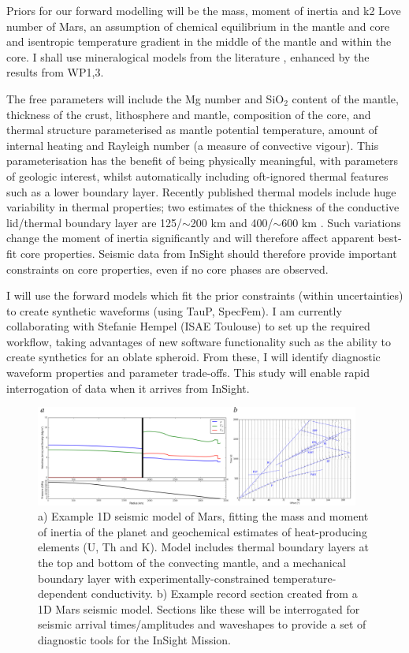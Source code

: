 \documentclass[11pt,twoside,a4paper]{article}
\begin{document}
Priors for our forward modelling will be the mass, moment of inertia and k2 Love number of Mars, an assumption of chemical equilibrium in the mantle and core and isentropic temperature gradient in the middle of the mantle and within the core. I shall use mineralogical models from the literature \citep[e.g.][]{SLB2011}, enhanced by the results from WP1,3. 

The free parameters will include the Mg number and SiO$_2$ content of the mantle, thickness of the crust, lithosphere and mantle, composition of the core, and thermal structure parameterised as mantle potential temperature, amount of internal heating and Rayleigh number (a measure of convective vigour). This parameterisation \citep[which will follow that described in][]{MJP2005} has the benefit of being physically meaningful, with parameters of geologic interest, whilst automatically including oft-ignored thermal features such as a lower boundary layer. Recently published thermal models include huge variability in thermal properties; two estimates of the thickness of the conductive lid/thermal boundary layer are 125/$\sim$200 km \citep{NF2013} and 400/$\sim$600 km \citep{KC2008}. Such variations change the moment of inertia significantly and will therefore affect apparent best-fit core properties. Seismic data from InSight should therefore provide important constraints on core properties, even if no core phases are observed. 

I will use the forward models which fit the prior constraints (within uncertainties) to create synthetic waveforms (using TauP, SpecFem). I am currently collaborating with Stefanie Hempel (ISAE Toulouse) to set up the required workflow, taking advantages of new software functionality such as the ability to create synthetics for an oblate spheroid. From these, I will identify diagnostic waveform properties and parameter trade-offs. This study will enable rapid interrogation of data when it arrives from InSight. 

\begin{figure}[!ht]
  \centering
  \includegraphics[width=0.95\textwidth]{figures/mars_model}
  \caption{a) Example 1D seismic model of Mars, fitting the mass and moment of inertia of the planet and geochemical estimates of heat-producing elements (U, Th and K). Model includes thermal boundary layers at the top and bottom of the convecting mantle, and a mechanical boundary layer with experimentally-constrained temperature-dependent conductivity. b) Example record section created from a 1D Mars seismic model. Sections like these will be interrogated for seismic arrival times/amplitudes and waveshapes to provide a set of diagnostic tools for the InSight Mission.}
  \label{fig:seismograms}
\end{figure}
\end{document}
